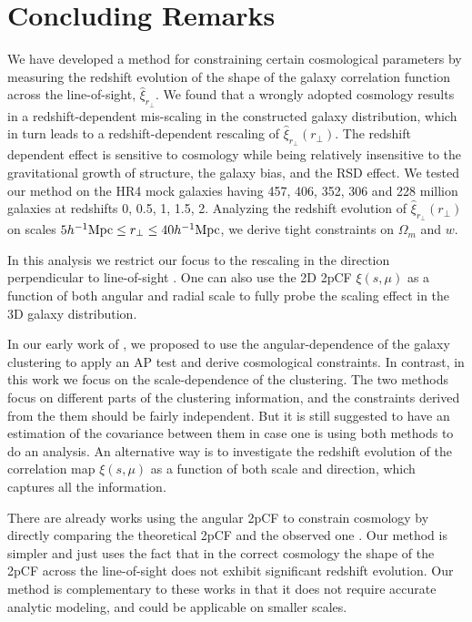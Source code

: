 \documentclass[iop]{emulateapj}
\begin{document}
\section{Concluding Remarks}
 
We have developed a method for constraining certain cosmological parameters by measuring the redshift evolution of the shape of the galaxy correlation function across the line-of-sight, $\hat \xi_{r_\perp}$.
We found that a wrongly adopted cosmology results in a redshift-dependent mis-scaling in the constructed galaxy distribution,
which in turn leads to a redshift-dependent rescaling of $\hat \xi_{r_\perp}(r_\perp)$.
The redshift dependent effect is sensitive to cosmology while being relatively insensitive to the gravitational growth of structure,
the galaxy bias, and the RSD effect.
We tested our method on the HR4 mock galaxies having 457, 406, 352, 306 and 228 million galaxies at redshifts 0, 0.5, 1, 1.5, 2.
Analyzing the redshift evolution of $\hat \xi_{r_\perp}(r_\perp)$ 
on scales $5  h^{-1} {\rm Mpc} \leq r_\perp \leq 40 h^{-1} {\rm Mpc}$, 
we derive tight constraints on $\Omega_m$ and $w$.

 
In this analysis we restrict our focus to the rescaling in the direction perpendicular to line-of-sight .
One can also use the 2D 2pCF $\xi(s,\mu)$ 
as a function of both angular and radial scale to fully probe the scaling effect in the 3D galaxy distribution.

In our early work of \cite{Li2015,Li2016}, 
we proposed to use the angular-dependence of the galaxy clustering to apply an AP test and derive cosmological constraints. 
In contrast, in this work we focus on the scale-dependence of the clustering. 
The two methods focus on different parts of the clustering information, and the constraints derived from the them should be fairly independent.
But it is still suggested to have an estimation of the covariance between them in case one is using both methods to do an analysis. 
An alternative way is to investigate the redshift evolution of the correlation map $\xi(s,\mu)$ as a function of both scale and direction, which captures all the information.

There are already works using the angular 2pCF to constrain cosmology
by directly comparing the theoretical 2pCF and the observed one \citep{Salvador2014,Salvador2016}.
Our method is simpler and just uses the fact that in the correct cosmology the shape of the 2pCF across the line-of-sight
does not exhibit significant redshift evolution.
Our method is complementary to these works in that
it does not require accurate analytic modeling, 
and could be applicable on smaller scales.
\end{document}
